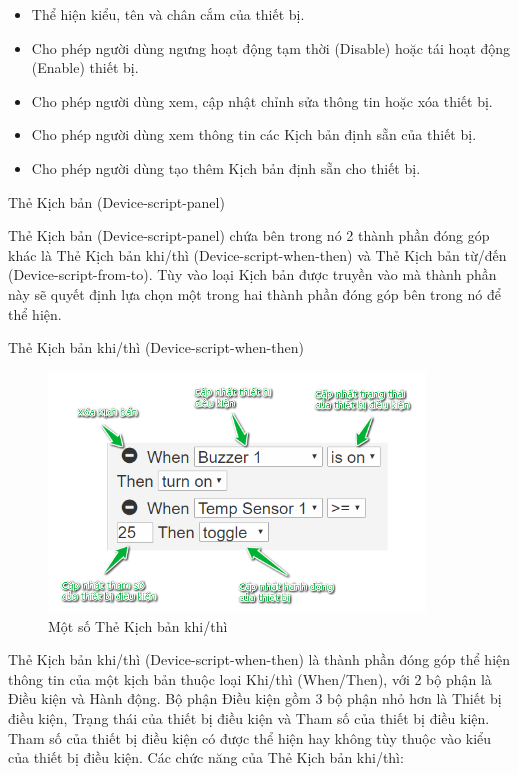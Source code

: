 \documentclass[11pt,a4paper,oneside]{book}
\begin{document}
\begin{itemize}[topsep=1mm,itemsep=-0.5mm]
\item Thể hiện kiểu, tên và chân cắm của thiết bị.
\item Cho phép người dùng ngưng hoạt động tạm thời (Disable) hoặc tái hoạt động (Enable) thiết bị.
\item Cho phép người dùng xem, cập nhật chỉnh sửa thông tin hoặc xóa thiết bị.
\item Cho phép người dùng xem thông tin các Kịch bản định sẵn của thiết bị.
\item Cho phép người dùng tạo thêm Kịch bản định sẵn cho thiết bị.
\vspace{1mm}
\end{itemize}

Thẻ Kịch bản (Device-script-panel)

Thẻ Kịch bản (Device-script-panel) chứa bên trong nó 2 thành phần đóng góp khác là Thẻ Kịch bản khi/thì (Device-script-when-then) và Thẻ Kịch bản từ/đến (Device-script-from-to). Tùy vào loại Kịch bản được truyền vào mà thành phần này sẽ quyết định lựa chọn một trong hai thành phần đóng góp bên trong nó để thể hiện.

Thẻ Kịch bản khi/thì (Device-script-when-then)

\begin{figure}[h]
  \centering
     \includegraphics[width=10cm]{6-device-script-when-then}
  \caption{Một số Thẻ Kịch bản khi/thì}\label{fig:6-device-script-when-then}
\end{figure}

Thẻ Kịch bản khi/thì (Device-script-when-then) là thành phần đóng góp thể hiện thông tin của một kịch bản thuộc loại Khi/thì (When/Then), với 2 bộ phận là Điều kiện và Hành động. Bộ phận Điều kiện gồm 3 bộ phận nhỏ hơn là Thiết bị điều kiện, Trạng thái của thiết bị điều kiện và Tham số của thiết bị điều kiện. Tham số của thiết bị điều kiện có được thể hiện hay không tùy thuộc vào kiểu của thiết bị điều kiện. Các chức năng của Thẻ Kịch bản khi/thì:
\end{document}
